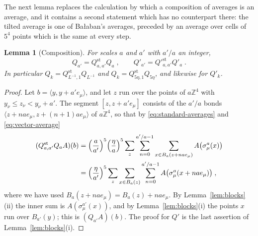 \documentclass[11pt]{preprint}
\numberwithin{equation}{section}
\newtheorem{lemma}[theorem]{Lemma}
\theoremstyle{definition}
\theoremstyle{remark}
\theoremstyle{plain}
\begin{document}
The next lemma replaces the calculation \cite[(1.16)--(1.18), p.~20]{BalabanPRT1} by which a composition of averages is an average, and it contains a second statement which has no counterpart there: the tilted average is one of Ba{\l}aban's averages, preceded by an average over cells of $5^4$ points which is the same at every step.

\begin{lemma}[Composition]\label{lem:composition}
For scales $a$ and $a'$ with $a'/a$ an integer,
\begin{equation}\label{eq:composition}
    Q_{a'} = Q^{\mathrm{st}}_{a,a'}Q_a\;,
    \qquad
    Q'_{a'} = Q'^{\mathrm{st}}_{a,a'}Q'_a\;.
\end{equation}
In particular $Q_k = Q^{\mathrm{st}}_{L^{-1},1}Q_{L^{-1}}$ and $Q_k = Q^{\mathrm{st}}_{5\eta,1}Q_{5\eta}$, and likewise for $Q'_k$.
\end{lemma}

\begin{proof}
Let $b = \langle y, y + a'e_\mu\rangle$, and let $z$ run over the points of $a\mathbb Z^4$ with $y_\nu \leq z_\nu < y_\nu + a'$. The segment $[z, z + a'e_\mu]$ consists of the $a'/a$ bonds $\langle z + nae_\mu, z + (n + 1)ae_\mu\rangle$ of $a\mathbb Z^4$, so that by \eqref{eq:standard-averages} and \eqref{eq:vector-average}
\begin{equation}\label{eq:composition-proof}
\begin{split}
    (Q^{\mathrm{st}}_{a,a'}Q_aA)(b) &= \Bigl(\frac{a}{a'}\Bigr)^5\Bigl(\frac{\eta}{a}\Bigr)^5\sum_z\sum_{n=0}^{a'/a-1}\sum_{x \in B_a(z + nae_\mu)}A\bigl(\sigma^a_\mu(x)\bigr)\\
    &= \Bigl(\frac{\eta}{a'}\Bigr)^5\sum_z\sum_{x \in B_a(z)}\sum_{n=0}^{a'/a-1}A\bigl(\sigma^a_\mu(x + nae_\mu)\bigr)\;,
\end{split}
\end{equation}
where we have used $B_a(z + nae_\mu) = B_a(z) + nae_\mu$. By Lemma~\ref{lem:blocks}(ii) the inner sum is $A(\sigma^{a'}_\mu(x))$, and by Lemma~\ref{lem:blocks}(i) the points $x$ run over $B_{a'}(y)$; this is $(Q_{a'}A)(b)$. The proof for $Q'$ is the last assertion of Lemma~\ref{lem:blocks}(i).
\end{proof}
\end{document}
